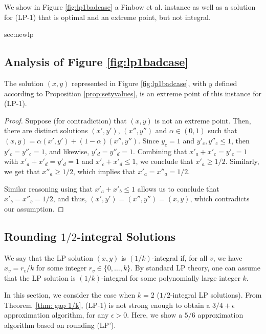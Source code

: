 We show in Figure \ref{fig:lp1badcase} a Finbow et al. instance as well as a
solution for (LP-1) that is optimal and an extreme point, but not integral.

\begin{appendixextra}{sec:newlp}{\subsection{Analysis of Figure \ref{fig:lp1badcase}}}
\begin{claim}

The solution $(x,y)$ represented in Figure \ref{fig:lp1badcase}, with $y$ defined according to
Proposition \ref{prop:setyvalues}, is an extreme point of this instance for
(LP-1).

\end{claim}

\begin{proof}

Suppose (for contradiction) that $(x,y)$ is not an extreme point. Then, there
are distinct solutions $(x',y')$, $(x'',y'')$ and $\alpha \in (0,1)$ such that
$(x,y) = \alpha(x',y') + (1-\alpha)(x'',y'')$. Since $y_c = 1$ and $y'_c,
y''_c \leq 1$, then $y'_c = y''_c = 1$, and likewise, $y'_d = y''_d = 1$.
Combining that $x'_a + x'_c = y'_c = 1$ with $x'_a + x'_d = y'_d = 1$ and
$x'_c + x'_d \leq 1$, we conclude that $x'_a \geq 1/2$. Similarly, we get that
$x''_a \geq 1/2$, which implies that $x'_a = x''_a = 1/2$.

Similar reasoning using that $x'_a + x'_b \leq 1$ allows us to conclude that
$x'_b = x''_b = 1/2$, and thus, $(x',y') = (x'',y'') = (x,y)$, which
contradicts our assumption.
\end{proof}
\end{appendixextra}


\subsection{Rounding \texorpdfstring{$1/2$}{1/2}-integral Solutions}
\label{sec:half-int}
We say that the LP solution $(x,y)$ is $(1/k)$-integral if, for all $v$, we have $x_v = r_v/k$ for some integer $r_v
\in \{0,\ldots,k\}$.  
By standard LP theory, one can assume that the LP solution is $(1/k)$-integral for some polynomially large integer $k$. 



In this section, we consider the case when $k=2$ ($1/2$-integral LP solutions).  
From Theorem~\ref{thm: gap 1/k}, (LP-1) is not strong enough to obtain a $3/4+\epsilon$ approximation algorithm, for any $\epsilon > 0$. 
Here, we show a $5/6$ approximation algorithm based on rounding (LP').  

